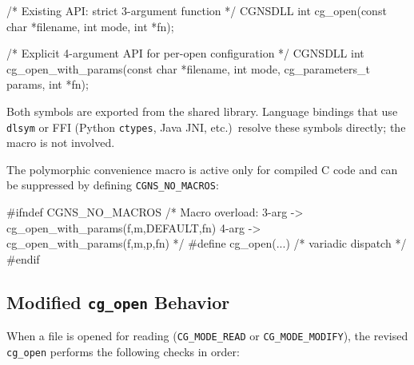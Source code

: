 \documentclass[11pt,letterpaper]{article}
\makeatletter
\let\cgns@orig@lstlisting\lstlisting
\let\cgns@endorig@lstlisting\endlstlisting
\renewenvironment{lstlisting}
  {\par\needspace{5\baselineskip}\nolinenumbers\cgns@orig@lstlisting}
  {\cgns@endorig@lstlisting\par\linenumbers}
\makeatother
\begin{document}
\begin{lstlisting}[language=C]
/* Existing API: strict 3-argument function */
CGNSDLL int cg_open(const char *filename, int mode, int *fn);

/* Explicit 4-argument API for per-open configuration */
CGNSDLL int cg_open_with_params(const char *filename, int mode,
                                cg_parameters_t params, int *fn);
\end{lstlisting}

Both symbols are exported from the shared library.
Language bindings that use \texttt{dlsym} or FFI (Python
\texttt{ctypes}, Java JNI, etc.)\ resolve these symbols directly;
the macro is not involved.

The polymorphic convenience macro is active only for compiled C
code and can be suppressed by defining \texttt{CGNS\_NO\_MACROS}:

\begin{lstlisting}[language=C]
#ifndef CGNS_NO_MACROS
  /* Macro overload: 3-arg -> cg_open_with_params(f,m,DEFAULT,fn)
     4-arg -> cg_open_with_params(f,m,p,fn) */
  #define cg_open(...) /* variadic dispatch */
#endif
\end{lstlisting}

\subsection{Modified \texttt{cg\_open} Behavior}

When a file is opened for reading (\texttt{CG\_MODE\_READ} or
\texttt{CG\_MODE\_MODIFY}), the revised \texttt{cg\_open} performs
the following checks in order:
\end{document}
